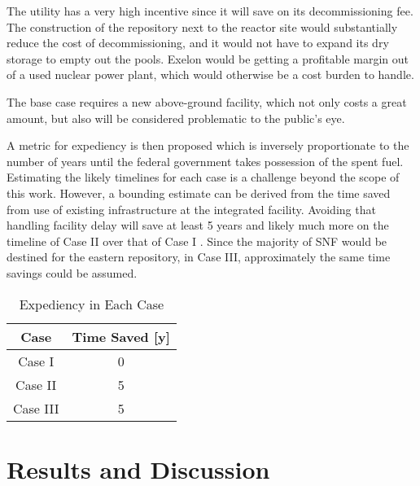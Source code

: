 The utility has a very high incentive since it will save on its decommissioning fee.
The construction of the repository next to the reactor site would substantially
reduce the cost of decommissioning, and it would not have to expand its dry storage
to empty out the pools. Exelon would be getting a profitable margin out of a
used nuclear power plant, which would otherwise be a cost burden to handle.

The base case requires a new above-ground facility, which not only costs a great
amount, but also will be considered problematic to the public's eye. 




A metric for expediency is then proposed which is inversely proportionate to 
the number of years until the federal government takes possession of the spent 
fuel. Estimating the likely timelines for each case is a challenge beyond the 
scope of this work. However, a bounding estimate can be derived from the time 
saved from use of existing infrastructure at the integrated facility. Avoiding 
that handling facility delay will save at least 5 years 
and likely much more on the timeline of Case II over that of Case I 
\cite{doe_strategy_2013}. Since the 
majority of \gls{SNF} would be destined for the eastern repository, in Case 
III, approximately the same time savings could be assumed.

\begin{table}[h]
	\centering
        \caption {Expediency in Each Case}
		\begin{tabular}{|c|c|}
			\hline
                        Case & Time Saved [y] \\
			\hline
			Case I & 0 \\
			Case II & 5 \\
			Case III & 5\\ 
			\hline
                \end{tabular}
\end{table}

\section{Results and Discussion} 


